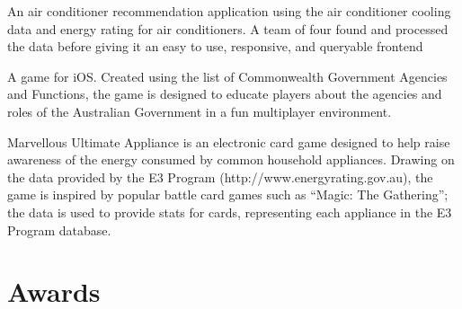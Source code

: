 \documentclass[a4paper]{deedy-resume} %
\begin{document}
\begin{minipage}[t]{0.66\textwidth}
\sectionspace %



An air conditioner recommendation application using the air conditioner cooling data and energy rating for air conditioners. A team of four found and processed the data before giving it an easy to use, responsive, and queryable frontend

\sectionspace %



A game for iOS. Created using the list of Commonwealth Government Agencies and Functions, the game is designed to educate players about the agencies and roles of the Australian Government in a fun multiplayer environment.

\sectionspace %



Marvellous Ultimate Appliance is an electronic card game designed to help raise awareness of the energy consumed by common household appliances. Drawing on the data provided by the E3 Program (http://www.energyrating.gov.au), the game is inspired by popular battle card games such as “Magic: The Gathering”; the data is used to provide stats for cards, representing each appliance in the E3 Program database.
\sectionspace %


\section{Awards}


\end{minipage}
\end{document}

